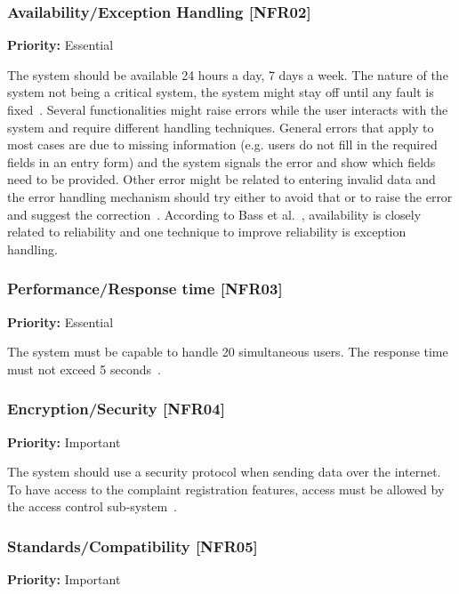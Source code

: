 \documentclass[11pt,twoside]{article}
\begin{document}
\subsubsection{Availability/Exception Handling [NFR02]}

\textbf{Priority:} Essential


The system should be available 24 hours a day, 7 days a week. The nature of the system not being a critical system, the system might stay
off until any fault is fixed~\cite{hw-usecase}. Several functionalities might raise errors while the user interacts with the system and
require different handling techniques. General errors that apply to most cases are due to missing information (e.g. users do not fill in the
required fields in an entry form) and the system signals the error and show which fields need to be provided. Other error might be related
to entering invalid data and the error handling mechanism should try either to avoid that or to raise the error and suggest the
correction~\cite{hw-aore}. According to Bass et al.~\cite[Chapter 4.1]{Bass:1998:SAP}, availability is closely related to reliability and
one technique to improve reliability is exception handling.


\subsubsection{Performance/Response time [NFR03]}

\textbf{Priority:} Essential

The system must be capable to handle 20 simultaneous users. The response time must not exceed 5
seconds~\cite{hw-usecase,hw-alignment}.

\subsubsection{Encryption/Security [NFR04]}

\textbf{Priority:} Important

The system should use a security protocol when sending data over the internet. To have access to the complaint registration features, access
must be allowed by the access control sub-system~\cite{hw-aore,hw-usecase}.

\subsubsection{Standards/Compatibility [NFR05]}

\textbf{Priority:} Important
\end{document}
